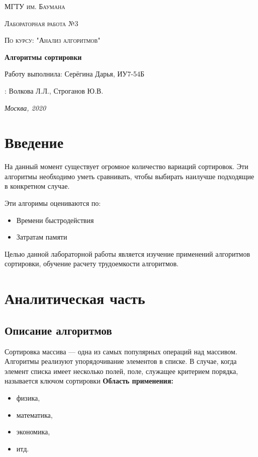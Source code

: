 \documentclass[12pt]{report}
\begin{document}
\begin{titlepage}
	\centering
	{\scshape\LARGE МГТУ им. Баумана \par}
	\vspace{3cm}
	{\scshape\Large Лабораторная работа №3\par}
	\vspace{0.5cm}	
	{\scshape\Large По курсу: "Анализ алгоритмов"\par}
	\vspace{1.5cm}
	{\huge\bfseries Алгоритмы сортировки\par}
	\vspace{2cm}
	\Large Работу выполнила: Серёгина Дарья, ИУ7-54Б\par
	\vspace{0.5cm}
	:  Волкова Л.Л., Строганов Ю.В.\par

	\vfill
	\large \textit {Москва, 2020} \par
\end{titlepage}

\tableofcontents

\newpage
\chapter*{Введение}

На данный момент существует огромное количество вариаций сортировок.
Эти алгоритмы необходимо уметь сравнивать, чтобы выбирать наилучше подходящие в конкретном случае. 

Эти алгоримы оцениваются по:

\begin{itemize}
	\item Времени быстродействия
	\item Затратам памяти
\end{itemize}

Целью данной лабораторной работы является изучение применений алгоритмов сортировки, обучение расчету трудоемкости алгоритмов.


\chapter{Аналитическая часть}
\section{Описание алгоритмов}
Сортировка массива — одна из самых популярных операций над массивом. Алгоритмы реализуют упорядочивание элементов в списке.
 В случае, когда элемент списка имеет несколько полей, поле, служащее критерием порядка, называется ключом сортировки
\textbf{Область применения:} 
\begin{itemize}
  	\item физика,
	\item математика,
	\item экономика,
	\item итд.
\end{itemize}
\end{document}
